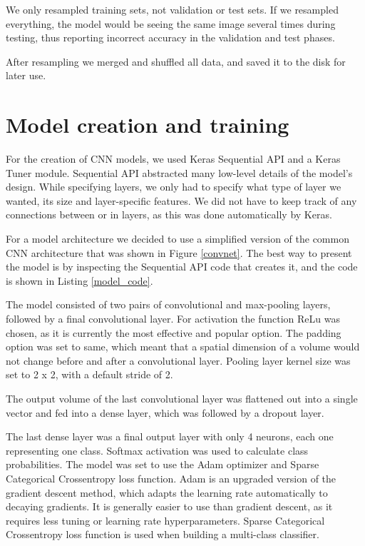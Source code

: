 We only resampled training sets, not validation or test sets.
If we resampled everything, the model would be seeing the same image several times during testing, thus reporting incorrect accuracy in the validation and test phases.

After resampling we merged and shuffled all data, and saved it to the disk for later use.

\newpage
\section{ Model creation and training}\label{cnn_ref}

For the creation of CNN models, we used Keras Sequential API and a Keras Tuner module.
Sequential API abstracted many low-level details of the model's design.
While specifying layers, we only had to specify what type of layer we wanted, its size and layer-specific features. 
We did not have to keep track of any connections between or in layers, as this was done automatically by Keras.

For a model architecture we decided to use a simplified version of the common CNN architecture that was shown in Figure \ref{convnet}.
The best way to present the model is by inspecting the Sequential API code that creates it, and the code is shown in Listing \ref{model_code}.

The model consisted of two pairs of convolutional and max-pooling layers, followed by a final convolutional layer.
For activation the function ReLu was chosen, as it is currently the most effective and popular option\cite{cs231n}\cite{geron}.
The padding option was set to same, which meant that a spatial dimension of a volume would not change before and after a convolutional layer.
Pooling layer kernel size was set to 2 x 2, with a default stride of 2.

The output volume of the last convolutional layer was flattened out into a single vector and fed into a dense layer, which was followed by a dropout layer\footnotemark.

The last dense layer was a final output layer with only 4 neurons, each one representing one class.
Softmax activation was used to calculate class probabilities.
The model was set to use the Adam optimizer and Sparse Categorical Crossentropy loss function.
Adam is an upgraded version of the gradient descent method, which adapts the learning rate automatically to decaying gradients\cite{geron}.
It is generally easier to use than gradient descent, as it requires less tuning or learning rate hyperparameters.
Sparse Categorical Crossentropy loss function is used when building a multi-class classifier.

